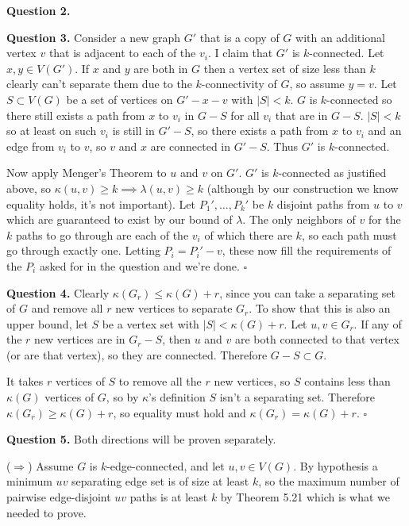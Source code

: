 \documentclass[letterpaper, reqno,11pt]{article}
\begin{document}
{\medskip\noindent\bf Question 2.} 

{\medskip\noindent\bf Question 3.} Consider a new graph $G'$ that is a copy of $G$ with an additional vertex $v$ that is adjacent to each of the $v_i$. I claim that $G'$ is $k$-connected. Let $x,y\in V(G')$. If $x$ and $y$ are both in $G$ then a vertex set of size less than $k$ clearly can't separate them due to the $k$-connectivity of $G$, so assume $y=v$. Let $S\subset V(G)$ be a set of vertices on $G'-x-v$ with $|S|<k$. $G$ is $k$-connected so there still exists a path from $x$ to $v_i$ in $G-S$ for all $v_i$ that are in $G-S$. $|S|<k$ so at least on such $v_i$ is still in $G'-S$, so there exists a path from $x$ to $v_i$ and an edge from $v_i$ to $v$, so $v$ and $x$ are connected in $G'-S$. Thus $G'$ is $k$-connected. 

Now apply Menger's Theorem to $u$ and $v$ on $G'$. $G'$ is $k$-connected as justified above, so $\kappa(u,v)\geq k\implies \lambda(u,v)\geq k$ (although by our construction we know equality holds, it's not important). Let $P_1', \ldots, P_k'$ be $k$ disjoint paths from $u$ to $v$ which are guaranteed to exist by our bound of $\lambda$. The only neighbors of $v$ for the $k$ paths to go through are each of the $v_i$ of which there are $k$, so each path must go through exactly one. Letting $P_i=P_i'-v$, these now fill the requirements of the $P_i$ asked for in the question and we're done. $\square$

{\medskip\noindent\bf Question 4.} Clearly $\kappa(G_r)\leq \kappa(G)+r$, since you can take a separating set of $G$ and remove all $r$ new vertices to separate $G_r$. To show that this is also an upper bound, let $S$ be a vertex set with $|S|<\kappa(G)+r$. Let $u,v\in G_r$. If any of the $r$ new vertices are in $G_r-S$, then $u$ and $v$ are both connected to that vertex (or are that vertex), so they are connected. Therefore $G-S\subset G$. 

It takes $r$ vertices of $S$ to remove all the $r$ new vertices, so $S$ contains less than $\kappa(G)$ vertices of $G$, so by $\kappa$'s definition $S$ isn't a separating set. Therefore $\kappa(G_r)\geq \kappa(G)+r$, so equality must hold and $\kappa(G_r)=\kappa(G)+r$. $\square$

{\medskip\noindent\bf Question 5.} Both directions will be proven separately. 

($\Rightarrow$) Assume $G$ is $k$-edge-connected, and let $u,v\in V(G)$. By hypothesis a minimum $uv$ separating edge set is of size at least $k$, so the maximum number of pairwise edge-disjoint $uv$ paths is at least $k$ by Theorem 5.21 which is what we needed to prove. 
\end{document}
